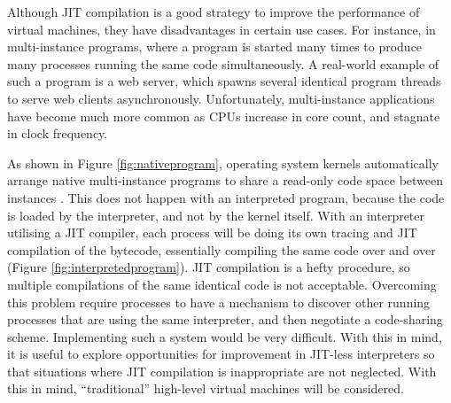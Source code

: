		Although JIT compilation is a good strategy to improve the performance of virtual machines, they have disadvantages in certain use cases. For instance, in multi-instance programs, where a program is started many times to produce many processes running the same code simultaneously. A real-world example of such a program is a web server, which spawns several identical program threads to serve web clients asynchronously. Unfortunately, multi-instance applications have become much more common as CPUs increase in core count, and stagnate in clock frequency.
		
		As shown in Figure \ref{fig:nativeprogram}, operating system kernels automatically arrange native multi-instance programs to share a read-only code space between instances \citep{sharedcodepatent}. This does not happen with an interpreted program, because the code is loaded by the interpreter, and not by the kernel itself. With an interpreter utilising a JIT compiler, each process will be doing its own tracing and JIT compilation of the bytecode, essentially compiling the same code over and over (Figure \ref{fig:interpretedprogram}). JIT compilation is a hefty procedure, so multiple compilations of the same identical code is not acceptable. Overcoming this problem require processes to have a mechanism to discover other running processes that are using the same interpreter, and then negotiate a code-sharing scheme. Implementing such a system would be very difficult. With this in mind, it is useful to explore opportunities for improvement in JIT-less interpreters so that situations where JIT compilation is inappropriate are not neglected. With this in mind, ``traditional'' high-level virtual machines will be considered. 
		
